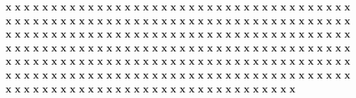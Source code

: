 \documentclass{article}
\begin{document}
\textbf{x}
\textbf{x}
\textbf{x}
\textbf{x}
\textbf{x}
\textbf{x}
\textbf{x}
\textbf{x}
\textbf{x}
\textbf{x}
\textbf{x}
\textbf{x}
\textbf{x}
\textbf{x}
\textbf{x}
\textbf{x}
\textbf{x}
\textbf{x}
\textbf{x}
\textbf{x}
\textbf{x}
\textbf{x}
\textbf{x}
\textbf{x}
\textbf{x}
\textbf{x}
\textbf{x}
\textbf{x}
\textbf{x}
\textbf{x}
\textbf{x}
\textbf{x}
\textbf{x}
\textbf{x}
\textbf{x}
\textbf{x}
\textbf{x}
\textbf{x}
\textbf{x}
\textbf{x}
\textbf{x}
\textbf{x}
\textbf{x}
\textbf{x}
\textbf{x}
\textbf{x}
\textbf{x}
\textbf{x}
\textbf{x}
\textbf{x}
\textbf{x}
\textbf{x}
\textbf{x}
\textbf{x}
\textbf{x}
\textbf{x}
\textbf{x}
\textbf{x}
\textbf{x}
\textbf{x}
\textbf{x}
\textbf{x}
\textbf{x}
\textbf{x}
\textbf{x}
\textbf{x}
\textbf{x}
\textbf{x}
\textbf{x}
\textbf{x}
\textbf{x}
\textbf{x}
\textbf{x}
\textbf{x}
\textbf{x}
\textbf{x}
\textbf{x}
\textbf{x}
\textbf{x}
\textbf{x}
\textbf{x}
\textbf{x}
\textbf{x}
\textbf{x}
\textbf{x}
\textbf{x}
\textbf{x}
\textbf{x}
\textbf{x}
\textbf{x}
\textbf{x}
\textbf{x}
\textbf{x}
\textbf{x}
\textbf{x}
\textbf{x}
\textbf{x}
\textbf{x}
\textbf{x}
\textbf{x}
\textbf{x}
\textbf{x}
\textbf{x}
\textbf{x}
\textbf{x}
\textbf{x}
\textbf{x}
\textbf{x}
\textbf{x}
\textbf{x}
\textbf{x}
\textbf{x}
\textbf{x}
\textbf{x}
\textbf{x}
\textbf{x}
\textbf{x}
\textbf{x}
\textbf{x}
\textbf{x}
\textbf{x}
\textbf{x}
\textbf{x}
\textbf{x}
\textbf{x}
\textbf{x}
\textbf{x}
\textbf{x}
\textbf{x}
\textbf{x}
\textbf{x}
\textbf{x}
\textbf{x}
\textbf{x}
\textbf{x}
\textbf{x}
\textbf{x}
\textbf{x}
\textbf{x}
\textbf{x}
\textbf{x}
\textbf{x}
\textbf{x}
\textbf{x}
\textbf{x}
\textbf{x}
\textbf{x}
\textbf{x}
\textbf{x}
\textbf{x}
\textbf{x}
\textbf{x}
\textbf{x}
\textbf{x}
\textbf{x}
\textbf{x}
\textbf{x}
\textbf{x}
\textbf{x}
\textbf{x}
\textbf{x}
\textbf{x}
\textbf{x}
\textbf{x}
\textbf{x}
\textbf{x}
\textbf{x}
\textbf{x}
\textbf{x}
\textbf{x}
\textbf{x}
\textbf{x}
\textbf{x}
\textbf{x}
\textbf{x}
\textbf{x}
\textbf{x}
\textbf{x}
\textbf{x}
\textbf{x}
\textbf{x}
\textbf{x}
\textbf{x}
\textbf{x}
\textbf{x}
\textbf{x}
\textbf{x}
\textbf{x}
\textbf{x}
\textbf{x}
\textbf{x}
\textbf{x}
\textbf{x}
\textbf{x}
\textbf{x}
\textbf{x}
\textbf{x}
\textbf{x}
\textbf{x}
\textbf{x}
\textbf{x}
\textbf{x}
\textbf{x}
\textbf{x}
\textbf{x}
\textbf{x}
\textbf{x}
\textbf{x}
\textbf{x}
\textbf{x}
\textbf{x}
\textbf{x}
\textbf{x}
\textbf{x}
\textbf{x}
\textbf{x}
\textbf{x}
\textbf{x}
\textbf{x}
\textbf{x}
\textbf{x}
\textbf{x}
\textbf{x}
\textbf{x}
\textbf{x}
\textbf{x}
\textbf{x}
\textbf{x}
\textbf{x}
\textbf{x}
\textbf{x}
\textbf{x}
\textbf{x}
\textbf{x}
\textbf{x}
\textbf{x}
\textbf{x}
\textbf{x}
\textbf{x}
\textbf{x}
\textbf{x}
\textbf{x}
\textbf{x}
\textbf{x}
\textbf{x}
\textbf{x}
\textbf{x}
\textbf{x}
\textbf{x}
\textbf{x}
\textbf{x}
\textbf{x}
\textbf{x}
\textbf{x}
\textbf{x}
\textbf{x}
\textbf{x}
\textbf{x}
\textbf{x}
\textbf{x}
\end{document}
